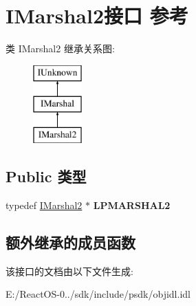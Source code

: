\hypertarget{interface_i_marshal2}{}\section{I\+Marshal2接口 参考}
\label{interface_i_marshal2}
类 I\+Marshal2 继承关系图\+:\begin{figure}[H]
\begin{center}
\leavevmode
\includegraphics[height=3.000000cm]{interface_i_marshal2}
\end{center}
\end{figure}
\subsection*{Public 类型}
\begin{DoxyCompactItemize}
\item 
\mbox{\label{interface_i_marshal2_a5ffc05ff5d166788835cab4e282db22e}} 
typedef \hyperlink{interface_i_marshal2}{I\+Marshal2} $\ast$ {\bfseries L\+P\+M\+A\+R\+S\+H\+A\+L2}
\end{DoxyCompactItemize}
\subsection*{额外继承的成员函数}


该接口的文档由以下文件生成\+:\begin{DoxyCompactItemize}
\item 
E\+:/\+React\+O\+S-\/0../sdk/include/psdk/objidl.\+idl\end{DoxyCompactItemize}
